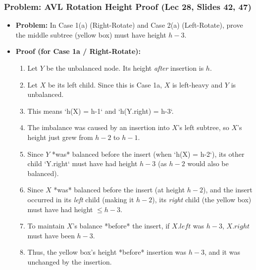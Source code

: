 \subsubsection{Problem: AVL Rotation Height Proof (Lec 28, Slides 42, 47)}
\begin{itemize}
    \item \textbf{Problem:} In Case 1(a) (Right-Rotate) and Case 2(a) (Left-Rotate), prove the middle subtree (yellow box) must have height $h-3$.
    \item \textbf{Proof (for Case 1a / Right-Rotate):}
    \begin{enumerate}
        \item Let $Y$ be the unbalanced node. Its height \textit{after} insertion is $h$.
        \item Let $X$ be its left child. Since this is Case 1a, $X$ is left-heavy and $Y$ is unbalanced.
        \item This means `h(X) = h-1` and `h(Y.right) = h-3`.
        \item The imbalance was caused by an insertion into $X$'s left subtree, so $X$'s height just grew from $h-2$ to $h-1$.
        \item Since $Y$ *was* balanced before the insert (when `h(X) = h-2`), its other child `Y.right` must have had height $h-3$ (as $h-2$ would also be balanced).
        \item Since $X$ *was* balanced before the insert (at height $h-2$), and the insert occurred in its \textit{left} child (making it $h-2$), its \textit{right} child (the yellow box) must have had height $\le h-3$.
        \item To maintain $X$'s balance *before* the insert, if $X.left$ was $h-3$, $X.right$ must have been $h-3$.
        \item Thus, the yellow box's height *before* insertion was $h-3$, and it was unchanged by the insertion.
    \end{enumerate}
\end{itemize}